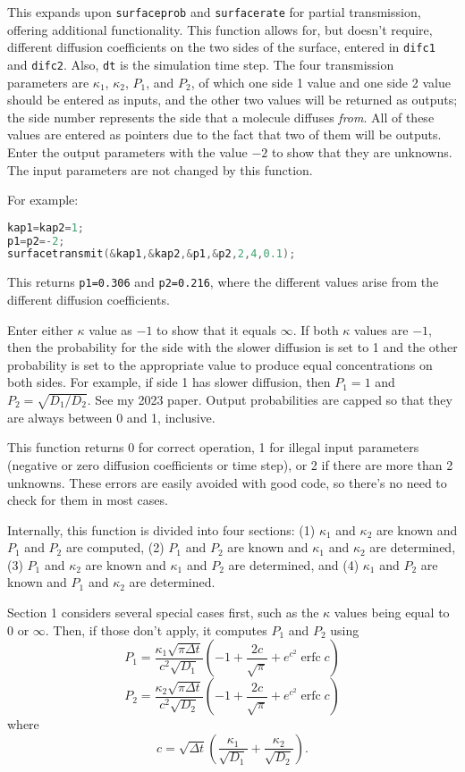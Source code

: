 \documentclass[11pt]{article}
\newcommand {\ttt} {\texttt}
\DeclareMathOperator{\erfc}{erfc}
\begin{document}
\begin{description}
This expands upon \ttt{surfaceprob} and \ttt{surfacerate} for partial transmission, offering additional functionality. This function allows for, but doesn't require, different diffusion coefficients on the two sides of the surface, entered in \ttt{difc1} and \ttt{difc2}. Also, \ttt{dt} is the simulation time step. The four transmission parameters are $\kappa_1$, $\kappa_2$, $P_1$, and $P_2$, of which one side 1 value and one side 2 value should be entered as inputs, and the other two values will be returned as outputs; the side number represents the side that a molecule diffuses \textit{from}. All of these values are entered as pointers due to the fact that two of them will be outputs. Enter the output parameters with the value $-2$ to show that they are unknowns. The input parameters are not changed by this function.

For example:
\begin{lstlisting}[language=C]
kap1=kap2=1;
p1=p2=-2;
surfacetransmit(&kap1,&kap2,&p1,&p2,2,4,0.1);
\end{lstlisting}
This returns \ttt{p1=0.306} and \ttt{p2=0.216}, where the different values arise from the different diffusion coefficients.

Enter either $\kappa$ value as $-1$ to show that it equals $\infty$. If both $\kappa$ values are $-1$, then the probability for the side with the slower diffusion is set to 1 and the other probability is set to the appropriate value to produce equal concentrations on both sides. For example, if side 1 has slower diffusion, then $P_1=1$ and $P_2 = \sqrt{D_1 / D_2}$. See my 2023 paper. Output probabilities are capped so that they are always between 0 and 1, inclusive.

This function returns 0 for correct operation, 1 for illegal input parameters (negative or zero diffusion coefficients or time step), or 2 if there are more than 2 unknowns. These errors are easily avoided with good code, so there's no need to check for them in most cases.

Internally, this function is divided into four sections: (1) $\kappa_1$ and $\kappa_2$ are known and $P_1$ and $P_2$ are computed, (2) $P_1$ and $P_2$ are known and $\kappa_1$ and $\kappa_2$ are determined, (3) $P_1$ and $\kappa_2$ are known and $\kappa_1$ and $P_2$ are determined, and (4) $\kappa_1$ and $P_2$ are known and $P_1$ and $\kappa_2$ are determined.

Section 1 considers several special cases first, such as the $\kappa$ values being equal to 0 or $\infty$. Then, if those don't apply, it computes $P_1$ and $P_2$ using
$$P_1 = \frac{\kappa_1 \sqrt{\pi \Delta t}}{c^{2} \sqrt{D_1}} \left( -1 + \frac{2c}{\sqrt{\pi}} + e^{c^2} \erfc c \right)$$
$$P_2 = \frac{\kappa_2 \sqrt{\pi \Delta t}}{c^{2} \sqrt{D_2}} \left( -1 + \frac{2c}{\sqrt{\pi}} + e^{c^2} \erfc c \right)$$
where
$$c=\sqrt{\Delta t} \left( \frac{\kappa_1}{\sqrt{D_1}}+\frac{\kappa_2}{\sqrt{ D_2}} \right).$$


\end{description}
\end{document}
